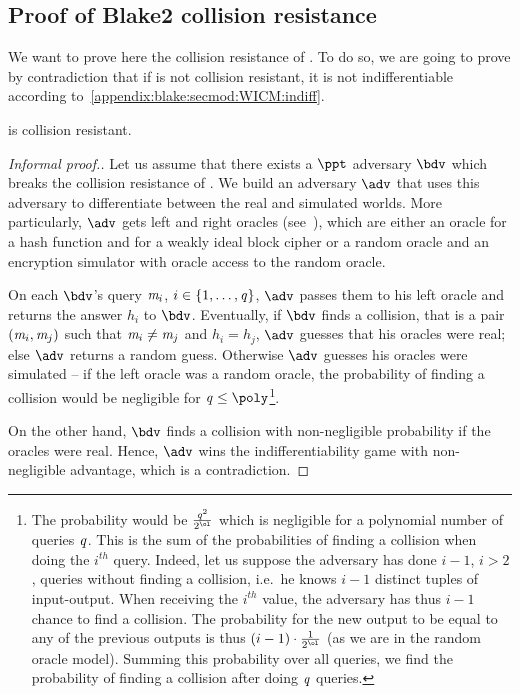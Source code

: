 \subsection{Proof of Blake2 collision resistance}\label{appendix:blake:proofs:colres}

We want to prove here the collision resistance of . To do so, we are going to prove by contradiction that if  is not collision resistant, it is not indifferentiable according to~\cref{appendix:blake:secmod:WICM:indiff}.

\begin{theorem}
     is collision resistant.
\end{theorem}
\begin{proof}[Informal proof.]
    Let us assume that there exists a $\ppt$ adversary $\bdv$ which breaks the collision resistance of . We build an adversary $\adv$ that uses this adversary to differentiate between the real and simulated worlds. More particularly, $\adv$ gets left and right oracles (see~\cite[Figure 3]{luykx2016security}), which are either an oracle for a hash function and for a weakly ideal block cipher or a random oracle and an encryption simulator with oracle access to the random oracle.

    On each $\bdv$'s query $\mathit{m}_i$, $i \in \{{1},\ldots,{\mathit{q}}\}$, $\adv$ passes them to his left oracle and returns the answer $h_i$ to $\bdv$.
    Eventually, if $\bdv$ finds a collision, that is a pair $(\mathit{m}_i, \mathit{m}_j)$ such that $\mathit{m}_i \neq \mathit{m}_j$ and $h_i = h_j$, $\adv$ guesses that his oracles were real; else $\adv$ returns a random guess. Otherwise $\adv$ guesses his oracles were simulated -- if the left oracle was a random oracle, the probability of finding a collision would be negligible for $\queryBound \leq \poly$\footnote{The probability would be $\frac{\queryBound^2}{2^{\ol}}$ which is negligible for a polynomial number of queries $\mathit{q}$. This is the sum of the probabilities of finding a collision when doing the $i^{th}$ query. Indeed, let us suppose the adversary has done $i-1$, $i>2$, queries without finding a collision, i.e.~he knows $i-1$ distinct tuples of input-output. When receiving the $i^{th}$ value, the adversary has thus $i-1$ chance to find a collision. The probability for the new output to be equal to any of the previous outputs is thus $(i-1) \cdot \frac{1}{2^{\ol}}$ (as we are in the random oracle model). Summing this probability over all queries, we find the probability of finding a collision after doing $\mathit{q}$ queries.}.

    On the other hand, $\bdv$ finds a collision with non-negligible probability if the oracles were real.
    Hence, $\adv$ wins the indifferentiability game with non-negligible advantage, which is a contradiction.
\end{proof}

